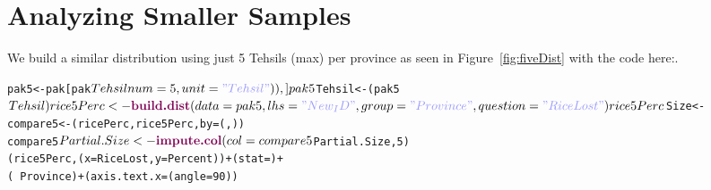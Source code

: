 \section{Analyzing Smaller Samples}
\label{sec:smallerDist}




We build a similar distribution using just 5 Tehsils (max) per province as seen in Figure~\ref{fig:fiveDist} with the code here:.
\begin{knitrout}
\color{fgcolor}\begin{kframe}
\begin{alltt}
pak5 <- pak[pak$Tehsil %
    num = 5, unit = \hlstring{"Tehsil"})), ]
pak5$Tehsil <- (pak5$Tehsil)
rice5Perc <- \hlfunctioncall{build.dist}(data = pak5, lhs = \hlstring{"New_ID"}, group = \hlstring{"Province"}, question = \hlstring{"RiceLost"})
rice5Perc$Size <- 
compare5 <- (ricePerc, rice5Perc, by = (, ))
compare5$Partial.Size <- \hlfunctioncall{impute.col}(col = compare5$Partial.Size, 5)
(rice5Perc, (x = RiceLost, y = Percent)) + (stat = ) + 
    (~Province) + (axis.text.x = (angle = 90))
\end{alltt}
\end{kframe}
\end{knitrout}


